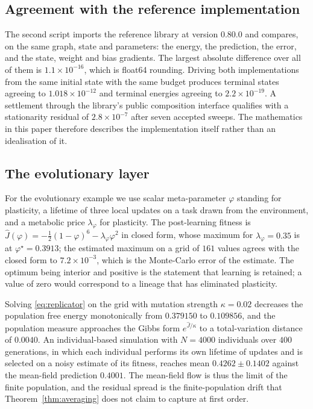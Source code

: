 \documentclass[11pt]{article}
\theoremstyle{definition}
\theoremstyle{remark}
\begin{document}
\subsection{Agreement with the reference implementation}
\label{ex:crosscheck}
The second script imports the reference library at version 0.80.0 and compares, on the same graph,
state and parameters: the energy, the prediction, the error, and the state, weight and bias gradients.
The largest absolute difference over all of them is $1.1\times10^{-16}$, which is float64 rounding.
Driving both implementations from the same initial state with the same budget produces terminal states
agreeing to $1.018\times10^{-12}$ and terminal energies agreeing to $2.2\times10^{-19}$. A settlement
through the library's public composition interface qualifies with a stationarity residual of
$2.8\times10^{-7}$ after seven accepted sweeps. The mathematics in this paper therefore describes the
implementation itself rather than an idealisation of it.

\subsection{The evolutionary layer}
\label{ex:evo}
For the evolutionary example we use scalar meta-parameter $\varphi$ standing for plasticity, a lifetime
of three local updates on a task drawn from the environment, and a metabolic price $\lambda_\varphi$
for plasticity. The post-learning fitness is
$\hat J(\varphi)=-\tfrac12(1-\varphi)^6-\lambda_\varphi\varphi^2$ in closed form, whose maximum for
$\lambda_\varphi=0.35$ is at $\varphi^\star=0.3913$; the estimated maximum on a grid of $161$ values
agrees with the closed form to $7.2\times10^{-3}$, which is the Monte-Carlo error of the estimate. The
optimum being interior and positive is the statement that learning is retained; a value of zero would
correspond to a lineage that has eliminated plasticity.

Solving \eqref{eq:replicator} on the grid with mutation strength $\kappa=0.02$ decreases the population
free energy monotonically from $0.379150$ to $0.109856$, and the population measure approaches the
Gibbs form $e^{\hat J/\kappa}$ to a total-variation distance of $0.0040$. An individual-based
simulation with $N=4000$ individuals over $400$ generations, in which each individual performs its own
lifetime of updates and is selected on a noisy estimate of its fitness, reaches mean
$0.4262\pm0.1402$ against the mean-field prediction $0.4001$. The mean-field flow is thus the limit of
the finite population, and the residual spread is the finite-population drift that
Theorem~\ref{thm:averaging} does not claim to capture at first order.
\end{document}
